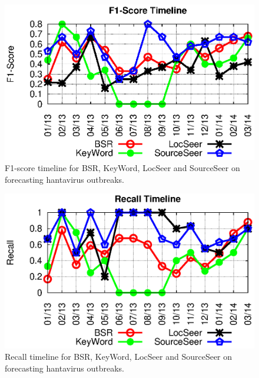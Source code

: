 \documentclass[twoside,leqno,twocolumn]{article}
\newcommand{\fullmodel}{{{\sf SourceSeer}}\xspace}
\newcommand{\locationmodel}{{\sf LocSeer}\xspace}
\newcommand{\keymodel}{{\sf KeyWord}\xspace}
\begin{document}
\begin{figure}
\begin{center}
	\includegraphics[clip,scale=0.65]{fig/f1_timeline.eps}
\end{center}
\caption{F1-score timeline for BSR, \keymodel, \locationmodel and \fullmodel on forecasting hantavirus outbreaks.}
 \label{fig:f1_timeline}
\end{figure}

\begin{figure}
\begin{center}
	\includegraphics[clip,scale=0.63]{fig/recall_timeline.eps}
\end{center}
\caption{Recall timeline for BSR, \keymodel, \locationmodel and \fullmodel on forecasting hantavirus outbreaks.}
 \label{fig:recall_timeline}
\end{figure}
\end{document}
